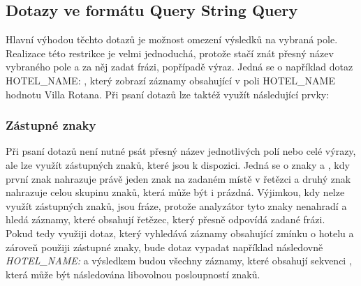 \documentclass[czech,BP]{thesiskiv}
\begin{document}
\subsection{Dotazy ve formátu Query String Query}
Hlavní výhodou těchto dotazů je možnost omezení výsledků na vybraná pole. Realizace této restrikce je velmi jednoduchá, protože stačí znát přesný název vybraného pole a za něj zadat frázi, popřípadě výraz. Jedná se o například dotaz HOTEL\_NAME: , který zobrazí záznamy obsahující v poli HOTEL\_NAME hodnotu Villa Rotana. Při psaní dotazů lze taktéž využít následující prvky:
\subsubsection{Zástupné znaky}
Při psaní dotazů není nutné psát přesný název jednotlivých polí nebo celé výrazy, ale lze využít zástupných znaků, které jsou k dispozici. Jedná se o znaky  a \uv{*}, kdy první znak nahrazuje právě jeden znak na zadaném místě v řetězci a druhý znak nahrazuje celou skupinu znaků, která může být i prázdná. Výjimkou, kdy nelze využít zástupných znaků, jsou fráze, protože analyzátor tyto znaky nenahradí a hledá záznamy, které obsahují řetězec, který přesně odpovídá zadané frázi.
\\
Pokud tedy využiji dotaz, který vyhledává záznamy obsahující zmínku o hotelu  a zároveň použiji zástupné znaky, bude dotaz vypadat například následovně \textit{HOTEL\_NAME: } a výsledkem budou všechny záznamy, které obsahují sekvenci , která může být následována libovolnou posloupností znaků.
\end{document}
